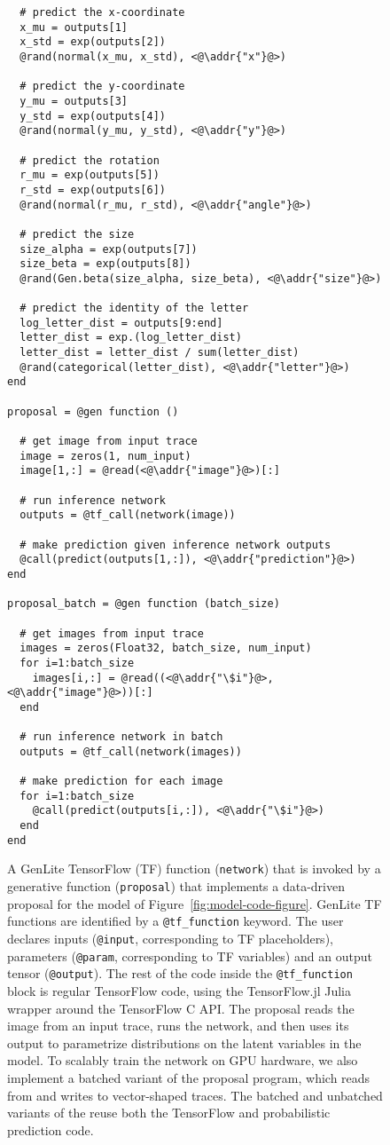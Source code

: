 \begin{figure}[t]
\begin{minipage}[t]{0.4\textwidth}
\begin{lstlisting}
  # predict the x-coordinate
  x_mu = outputs[1]
  x_std = exp(outputs[2])
  @rand(normal(x_mu, x_std), <@\addr{"x"}@>)

  # predict the y-coordinate
  y_mu = outputs[3]
  y_std = exp(outputs[4])
  @rand(normal(y_mu, y_std), <@\addr{"y"}@>)

  # predict the rotation
  r_mu = exp(outputs[5])
  r_std = exp(outputs[6])
  @rand(normal(r_mu, r_std), <@\addr{"angle"}@>)

  # predict the size 
  size_alpha = exp(outputs[7])
  size_beta = exp(outputs[8])
  @rand(Gen.beta(size_alpha, size_beta), <@\addr{"size"}@>)
  
  # predict the identity of the letter
  log_letter_dist = outputs[9:end]
  letter_dist = exp.(log_letter_dist)
  letter_dist = letter_dist / sum(letter_dist)
  @rand(categorical(letter_dist), <@\addr{"letter"}@>)
end

proposal = @gen function ()

  # get image from input trace
  image = zeros(1, num_input)
  image[1,:] = @read(<@\addr{"image"}@>)[:]

  # run inference network
  outputs = @tf_call(network(image))

  # make prediction given inference network outputs
  @call(predict(outputs[1,:]), <@\addr{"prediction"}@>)
end

proposal_batch = @gen function (batch_size)

  # get images from input trace
  images = zeros(Float32, batch_size, num_input)
  for i=1:batch_size
    images[i,:] = @read((<@\addr{"\$i"}@>, <@\addr{"image"}@>))[:]
  end

  # run inference network in batch
  outputs = @tf_call(network(images))
  
  # make prediction for each image
  for i=1:batch_size
    @call(predict(outputs[i,:]), <@\addr{"\$i"}@>)
  end
end
\end{lstlisting}
\end{minipage}
\caption{
A GenLite TensorFlow (TF) function (\texttt{network}) that is invoked by a generative function (\texttt{proposal}) that implements a data-driven proposal for the model of Figure~\ref{fig:model-code-figure}.
GenLite TF functions are identified by a \texttt{@tf\_function} keyword.
The user declares inputs (\texttt{@input}, corresponding to TF placeholders), parameters (\texttt{@param}, corresponding to TF variables) and an output tensor (\texttt{@output}).
The rest of the code inside the \texttt{@tf\_function} block is regular TensorFlow code, using the TensorFlow.jl Julia wrapper \cite{?} around the TensorFlow C API.
The proposal reads the image from an input trace, runs the network, and then uses its output to parametrize distributions on the latent variables in the model.
To scalably train the network on GPU hardware, we also implement a batched variant of the proposal program, which reads from and writes to vector-shaped traces.
The batched and unbatched variants of the reuse both the TensorFlow and probabilistic prediction code.
}
\label{fig:proposal-code-figure}
\end{figure}


